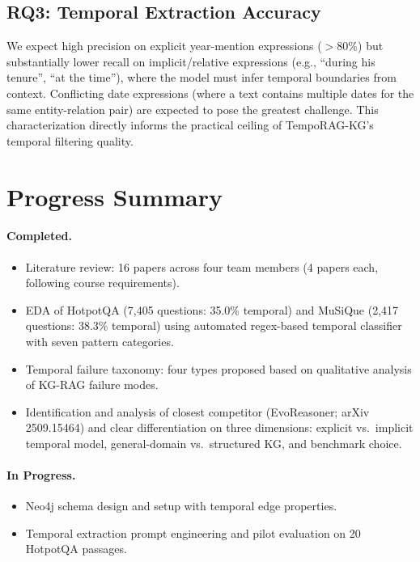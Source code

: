 \documentclass[11pt]{article}
\begin{document}
\subsection{RQ3: Temporal Extraction Accuracy}

We expect high precision on explicit year-mention expressions ($>$80\%)
but substantially lower recall on implicit/relative expressions (e.g.,
``during his tenure'', ``at the time''), where the model must infer
temporal boundaries from context. Conflicting date expressions (where
a text contains multiple dates for the same entity-relation pair) are
expected to pose the greatest challenge. This characterization directly
informs the practical ceiling of TempoRAG-KG's temporal filtering
quality.

\section{Progress Summary}

\paragraph{Completed.}
\begin{itemize}
  \item Literature review: 16 papers across four team members
    (4 papers each, following course requirements).
  \item EDA of HotpotQA (7,405 questions: 35.0\% temporal) and
    MuSiQue (2,417 questions: 38.3\% temporal) using automated
    regex-based temporal classifier with seven pattern categories.
  \item Temporal failure taxonomy: four types proposed based on
    qualitative analysis of KG-RAG failure modes.
  \item Identification and analysis of closest competitor (EvoReasoner;
    arXiv 2509.15464) and clear differentiation on three dimensions:
    explicit vs.\ implicit temporal model, general-domain vs.\
    structured KG, and benchmark choice.
\end{itemize}

\paragraph{In Progress.}
\begin{itemize}
  \item Neo4j schema design and setup with temporal edge properties.
  \item Temporal extraction prompt engineering and pilot evaluation
    on 20 HotpotQA passages.
\end{itemize}
\end{document}
